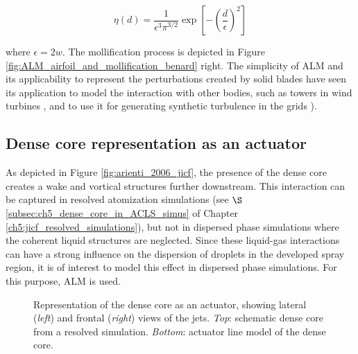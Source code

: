 \begin{equation}
\label{eq:ch4_ALM_mollification_function}
\eta \left( d \right) = \frac{1}{\epsilon^3 \pi^{3/2}} \exp \left[ - \left( \frac{d}{\epsilon} \right)^2 \right]
\end{equation}

where $\epsilon = 2 w$. The mollification process is depicted in Figure \ref{fig:ALM_airfoil_and_mollification_benard} right. The simplicity of ALM and its applicability to represent the perturbations created by solid blades have seen its application to model the interaction with other bodies, such as towers in wind turbines , and to use it for generating synthetic turbulence in the grids ).



\subsection{Dense core representation as an actuator}


As depicted in Figure \ref{fig:arienti_2006_jicf}, the presence of the dense core creates a wake and vortical structures further downstream. This interaction can be captured in resolved atomization simulations (see $\S$\ref{subsec:ch5_dense_core_in_ACLS_simus} of Chapter \ref{ch5:jicf_resolved_simulations}), but not in dispersed phase simulations where the coherent liquid structures are neglected. Since these liquid-gas interactions can have a strong influence on the dispersion of droplets in the developed spray region, it is of interest to model this effect in dispersed phase simulations. For this purpose, ALM is used.

\begin{figure}[h!]	
	\centering
	\caption[Representation of the dense core as an actuator]{Representation of the dense core as an actuator, showing lateral (\textsl{left}) and frontal (\textsl{right}) views of the jets. \textsl{Top}: schematic dense core from a resolved simulation. \textsl{Bottom}: actuator line model of the dense core.}
	\label{fig:ALM_DC_learning}
\end{figure}

